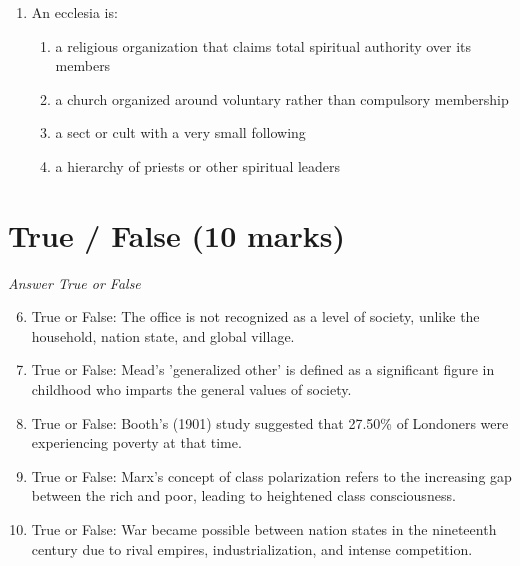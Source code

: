\documentclass[12pt]{article}
\begin{document}
\begin{enumerate}[label=\arabic*.]
\begin{enumerate}[label=(\alph*)]
    \item the white population did not believe in liberty, equality, and democracy
    \item they wanted to retain a strong sense of their original ethnic identity
    \item they were not prepared to leave the Southern states and move to North America
    \item the promise of citizenship was contradicted by continued discrimination
\end{enumerate}
\item An ecclesia is:
\begin{enumerate}[label=(\alph*)]
    \item a religious organization that claims total spiritual authority over its members
    \item a church organized around voluntary rather than compulsory membership
    \item a sect or cult with a very small following
    \item a hierarchy of priests or other spiritual leaders
\end{enumerate}
\end{enumerate}

\section*{True / False (10 marks)}
\textit{Answer True or False}
\begin{enumerate}[label=\arabic*.]
\setcounter{enumi}{5}
\item True or False: The office is not recognized as a level of society, unlike the household, nation state, and global village.
\item True or False: Mead's 'generalized other' is defined as a significant figure in childhood who imparts the general values of society.
\item True or False: Booth's (1901) study suggested that 27.50\% of Londoners were experiencing poverty at that time.
\item True or False: Marx's concept of class polarization refers to the increasing gap between the rich and poor, leading to heightened class consciousness.
\item True or False: War became possible between nation states in the nineteenth century due to rival empires, industrialization, and intense competition.
\end{enumerate}
\end{document}
